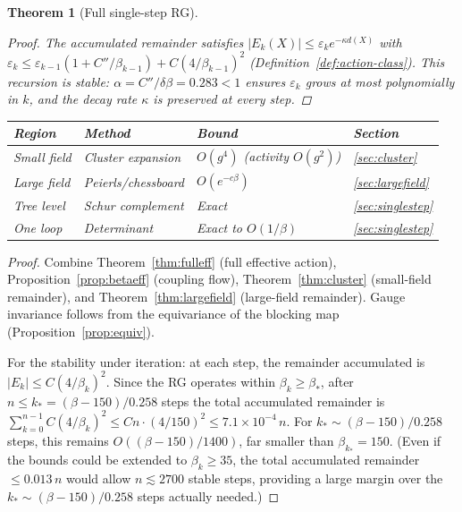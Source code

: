 \documentclass[11pt]{article}
\newtheorem{theorem}{Theorem}[section]
\theoremstyle{definition}
\begin{document}
\begin{theorem}[Full single-step RG]
\begin{proof}
The accumulated remainder satisfies
$|E_k(X)|\le\varepsilon_k e^{-\kappa d(X)}$ with
$\varepsilon_k\le\varepsilon_{k-1}(1+C''/\beta_{k-1})+C(4/\beta_{k-1})^2$
(Definition~\ref{def:action-class}).
This recursion is stable: $\alpha=C''/\delta\beta=0.283<1$
ensures $\varepsilon_k$ grows at most polynomially in $k$,
and the decay rate $\kappa$ is preserved at every step.
\end{proof}

\begin{center}
\begin{tabular}{llll}
\toprule
\textbf{Region} & \textbf{Method} & \textbf{Bound} & \textbf{Section}\\
\midrule
Small field & Cluster expansion & $O(g^4)$ (activity $O(g^2)$) & \ref{sec:cluster}\\
Large field & Peierls/chessboard & $O(e^{-c\beta})$ &
\ref{sec:largefield}\\
Tree level & Schur complement & Exact & \ref{sec:singlestep}\\
One loop & Determinant & Exact to $O(1/\beta)$ & \ref{sec:singlestep}\\
\bottomrule
\end{tabular}
\end{center}
\end{theorem}

\begin{proof}
Combine Theorem~\ref{thm:fulleff} (full effective action),
Proposition~\ref{prop:betaeff} (coupling flow),
Theorem~\ref{thm:cluster} (small-field remainder), and
Theorem~\ref{thm:largefield} (large-field remainder).
Gauge invariance follows from the equivariance of the blocking map
(Proposition~\ref{prop:equiv}).

For the stability under iteration: at each step, the remainder
accumulated is $|E_k|\le C(4/\beta_k)^2$.  Since the RG operates
within $\beta_k\ge\beta_*$, after $n\le k_*=(\beta-150)/0.258$ steps
the total accumulated remainder is
$\sum_{k=0}^{n-1}C(4/\beta_k)^2\le Cn\cdot(4/150)^2\le 7.1\times 10^{-4}\,n$.
For $k_*\sim(\beta-150)/0.258$ steps, this remains $O((\beta-150)/1400)$,
far smaller than $\beta_{k_*}=150$.  (Even if the bounds could be
extended to $\beta_k\ge 35$, the total accumulated remainder
$\le 0.013\,n$ would allow $n\lesssim 2700$ stable steps, providing
a large margin over the $k_*\sim(\beta-150)/0.258$ steps actually needed.)
\end{proof}

\end{document}
